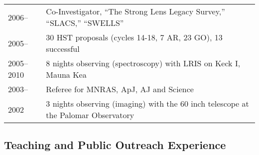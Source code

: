 \begin{tabular}{@{}p{2.5cm}p{15.5cm}}
2006--      & Co-Investigator, ``The Strong Lens Legacy Survey,'' ``SLACS,'' ``SWELLS''  \\
2005--      & 30 HST proposals (cycles 14-18, 7 AR, 23 GO), 13 successful \\
2005--2010  & 8 nights observing (spectroscopy) with LRIS on Keck I, Mauna Kea\\
2003--      & Referee for MNRAS, ApJ, AJ and Science\\
2002        & 3 nights observing (imaging) with the 60 inch telescope at the Palomar Observatory\\
\end{tabular}

\subsection*{Teaching and Public Outreach Experience}

